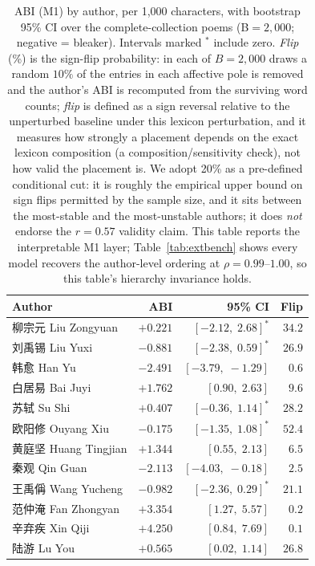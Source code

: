 \documentclass[10pt]{article}
\begin{document}
\begin{table}[H]
\centering\footnotesize
\caption{ABI (M1) by author, per 1{,}000 characters, with bootstrap
95\% CI over the complete-collection poems (B$=2{,}000$; negative = bleaker).
Intervals marked $^*$ include zero. \emph{Flip} (\%) is the sign-flip
probability: in each of $B{=}2{,}000$ draws a random $10\%$ of the entries in
each affective pole is removed and the author's ABI is recomputed from the
surviving word counts; \emph{flip} is defined as a sign reversal relative to the
unperturbed baseline under this lexicon perturbation, and it measures how strongly a
placement depends on the exact lexicon composition (a composition/sensitivity check),
not how valid the placement is. We adopt 20\% as a pre-defined conditional cut: it is
roughly the empirical upper bound on sign flips permitted by the sample size, and it
sits between the most-stable and the most-unstable authors; it does \emph{not} endorse
the $r{=}0.57$ validity claim. This table reports the interpretable M1 layer;
Table~\ref{tab:extbench} shows every model recovers the author-level ordering at
$\rho{=}0.99$--$1.00$, so this table's hierarchy invariance holds.}
\label{tab:abi}
\begin{tabular}{lrrr}
\toprule
Author & ABI & 95\% CI & Flip\\
\midrule
柳宗元 Liu Zongyuan & $+0.221$ & $[-2.12,\;2.68]^*$ & $34.2$\\
刘禹锡 Liu Yuxi & $-0.881$ & $[-2.38,\;0.59]^*$ & $26.9$\\
韩愈 Han Yu & $-2.491$ & $[-3.79,\;-1.29]$ & $0.6$\\
白居易 Bai Juyi & $+1.762$ & $[0.90,\;2.63]$ & $9.6$\\
苏轼 Su Shi & $+0.407$ & $[-0.36,\;1.14]^*$ & $28.2$\\
欧阳修 Ouyang Xiu & $-0.175$ & $[-1.35,\;1.08]^*$ & $52.4$\\
黄庭坚 Huang Tingjian & $+1.344$ & $[0.55,\;2.13]$ & $6.5$\\
秦观 Qin Guan & $-2.113$ & $[-4.03,\;-0.18]$ & $2.5$\\
王禹偁 Wang Yucheng & $-0.982$ & $[-2.36,\;0.29]^*$ & $21.1$\\
范仲淹 Fan Zhongyan & $+3.354$ & $[1.27,\;5.57]$ & $0.2$\\
辛弃疾 Xin Qiji & $+4.250$ & $[0.84,\;7.69]$ & $0.1$\\
陆游 Lu You & $+0.565$ & $[0.02,\;1.14]$ & $26.8$\\
\bottomrule
\end{tabular}
\end{table}
\end{document}

